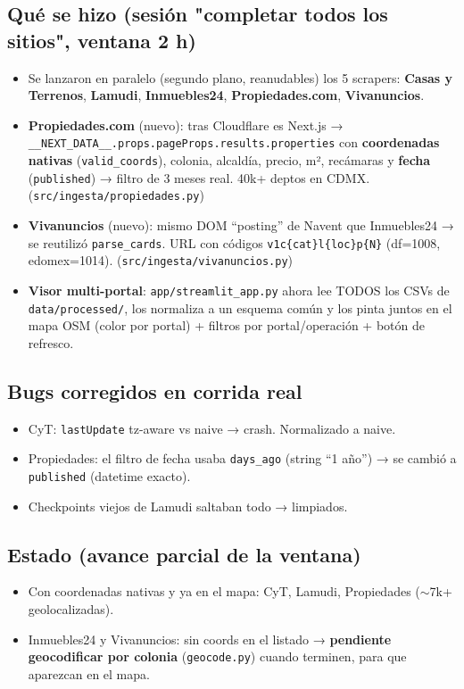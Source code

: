 \documentclass[11pt]{article}
\newcommand{\codigo}[1]{\texttt{#1}}
\begin{document}
\subsection*{Qué se hizo (sesión "completar todos los sitios", ventana 2 h)}
\begin{itemize}
  \item Se lanzaron en paralelo (segundo plano, reanudables) los 5 scrapers:
        \textbf{Casas y Terrenos}, \textbf{Lamudi}, \textbf{Inmuebles24},
        \textbf{Propiedades.com}, \textbf{Vivanuncios}.
  \item \textbf{Propiedades.com} (nuevo): tras Cloudflare es Next.js →
        \codigo{\_\_NEXT\_DATA\_\_.props.pageProps.results.properties} con
        \textbf{coordenadas nativas} (\codigo{valid\_coords}), colonia, alcaldía,
        precio, m², recámaras y \textbf{fecha} (\codigo{published}) → filtro de 3
        meses real. 40k+ deptos en CDMX. (\codigo{src/ingesta/propiedades.py})
  \item \textbf{Vivanuncios} (nuevo): mismo DOM ``posting'' de Navent que
        Inmuebles24 → se reutilizó \codigo{parse\_cards}. URL con códigos
        \codigo{v1c\{cat\}l\{loc\}p\{N\}} (df=1008, edomex=1014).
        (\codigo{src/ingesta/vivanuncios.py})
  \item \textbf{Visor multi-portal}: \codigo{app/streamlit\_app.py} ahora lee
        TODOS los CSVs de \codigo{data/processed/}, los normaliza a un esquema
        común y los pinta juntos en el mapa OSM (color por portal) + filtros por
        portal/operación + botón de refresco.
\end{itemize}

\subsection*{Bugs corregidos en corrida real}
\begin{itemize}
  \item CyT: \codigo{lastUpdate} tz-aware vs naive → crash. Normalizado a naive.
  \item Propiedades: el filtro de fecha usaba \codigo{days\_ago} (string ``1 año'')
        → se cambió a \codigo{published} (datetime exacto).
  \item Checkpoints viejos de Lamudi saltaban todo → limpiados.
\end{itemize}

\subsection*{Estado (avance parcial de la ventana)}
\begin{itemize}
  \item Con coordenadas nativas y ya en el mapa: CyT, Lamudi, Propiedades
        ($\sim$7k+ geolocalizadas).
  \item Inmuebles24 y Vivanuncios: sin coords en el listado → \textbf{pendiente
        geocodificar por colonia} (\codigo{geocode.py}) cuando terminen, para que
        aparezcan en el mapa.
\end{itemize}
\end{document}
